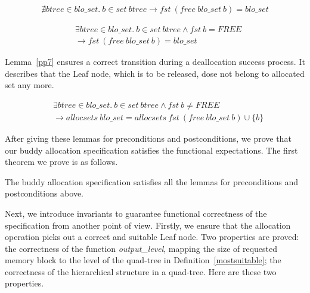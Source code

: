 \begin{lemma} 
\label{pp5}
\end{lemma}
\vspace{-7pt}
{\footnotesize
\begin{align*}
\nexists btree \in blo\_set.\ b \in set\ btree \longrightarrow fst\ (free\ blo\_set\ b) = blo\_set
\end{align*}
}
\vspace{-12pt}
	
\begin{lemma} 
\label{pp6}
\end{lemma}
\vspace{-7pt}
{\footnotesize
\begin{align*}
&\exists btree \in blo\_set.\ b \in set\ btree \wedge fst\ b = FREE \\
&\longrightarrow fst\ (free\ blo\_set\ b) = blo\_set
\end{align*}
}
\vspace{-12pt}

Lemma~\ref{pp7} ensures a correct transition during a deallocation success process. It describes that the Leaf node, which is to be released, dose not belong to allocated set any more.

\begin{lemma} 
\label{pp7}
\end{lemma}
\vspace{-7pt}
{\footnotesize
\begin{align*}
&\exists btree \in blo\_set.\ b \in set\ btree \wedge fst\ b \neq FREE \\ &\longrightarrow allocsets\ blo\_set = allocsets\ fst\ (free\ blo\_set\ b) \cup \lbrace b \rbrace
\end{align*}
}
\vspace{-12pt}

After giving these lemmas for preconditions and postconditions, we prove that our buddy allocation specification satisfies the functional expectations. The first theorem we prove is as follows.

\begin{theorem}
The buddy allocation specification satisfies all the lemmas for preconditions and postconditions above.
\end{theorem}

Next, we introduce invariants to guarantee functional correctness of the specification from another point of view. Firstly, we ensure that the allocation operation picks out
a correct and suitable Leaf node. Two properties are proved: the correctness of the function \emph{output\_level}, mapping the size of requested memory block to the level of the quad-tree in Definition~\ref{mostsuitable}; the correctness of the hierarchical structure in a quad-tree. Here are these two properties.

